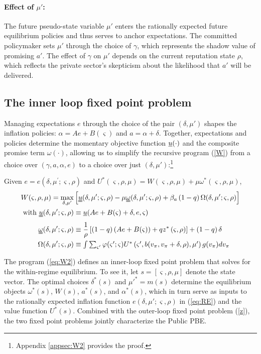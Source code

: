 \documentclass[12pt,letter,leqno]{article}
\theoremstyle{asn}
\theoremstyle{lem}
\theoremstyle{slem}
\theoremstyle{prop}
\theoremstyle{appprop}
\theoremstyle{rem}
\theoremstyle{defn}
\begin{document}
\paragraph{Effect of $\mu'$:} The future pseudo-state variable $\mu'$ enters the rationally expected future equilibrium policies and thus serves to anchor expectations. The committed policymaker sets $\mu'$ through the choice of $\gamma$, which represents the shadow value of promising $a'$. The effect of $\gamma$ on $\mu'$ depends on the current reputation state $\rho$, which reflects the private sector’s skepticism about the likelihood that $a'$ will be delivered.

\subsection{The inner loop fixed point problem}
Managing expectations $e$ through the choice of the pair $(\delta, \mu')$ shapes the inflation policies: $\alpha = Ae + B(\varsigma)$ and $a = \alpha + \delta$. Together, expectations and policies determine the momentary objective function $\uline{u}(\cdot)$ and the composite promise term $\omega(\cdot)$, allowing us to simplify the recursive program (\ref{W}) from a choice over $(\gamma, a, \alpha, e)$ to a choice over just $(\delta, \mu')$:\footnote{Appendix \ref{appsec:W2} provides the proof.}
\begin{prop}\label{prop:W2}%
Given $e =e\left( \delta ,\mu ^{\prime };\varsigma ,\rho \right)$ and $U^*\left( \varsigma ,\rho ,\mu \right)=W(\varsigma,\rho,\mu)+\mu\omega^*(\varsigma,\rho,\mu)$, 
\begin{align}
W(\varsigma,\rho,\mu) =\max_{\delta,\mu^{\prime}}&\left[\uuline{u}(
\delta ,\mu ^{\prime };\varsigma,\rho) -\mu \uuline{\omega}(\delta,\mu^{\prime
};\varsigma,\rho)+\beta_{a}\left( 1-q\right) \Omega( \delta ,\mu ^{\prime
};\varsigma,\rho) \right] \label{eq:W2} \\
\text{with }\uuline{u}(\delta,\mu';\varsigma,\rho) &\equiv \uline{u}(Ae+B(\varsigma)+\delta,e,\varsigma) \notag \\
\uuline{\omega}(\delta,\mu';\varsigma,\rho) &\equiv \frac{1}{\rho }\left[
\left( 1-q\right) \left( Ae+B(\varsigma )\right) +qz^{\ast }\left( \varsigma
,\rho \right) \right] +\left( 1-q\right) \delta \notag  \\
\Omega( \delta ,\mu ^{\prime} ;\varsigma,\rho )  &\equiv \textstyle\int \textstyle\sum_{\varsigma^{\prime
}}\varphi( \varsigma ^{\prime };\varsigma ) U^*\left( \varsigma
^{\prime },b( v_\pi ,v_\pi+\delta ,\rho) ,\mu ^{\prime }\right) g (v_\pi )dv_\pi \notag 
\end{align}
\end{prop}
The program (\ref{eq:W2}) defines an inner-loop fixed point problem that solves for the within-regime equilibrium. To see it, let $s = [\varsigma, \rho, \mu]$ denote the state vector. The optimal choices $\delta^*(s)$ and $\mu'^* = m(s)$ determine the equilibrium objects $\omega^*(s)$, $W(s)$, $a^*(s)$, and $\alpha^*(s)$, which in turn serve as inputs to the rationally expected inflation function $e(\delta, \mu'; \varsigma, \rho)$ in (\ref{eq:RE}) and the value function $U^*(s)$.  Combined with the outer-loop fixed point problem (\ref{z}), the two fixed point problems jointly characterize the Public PBE.
\end{document}
